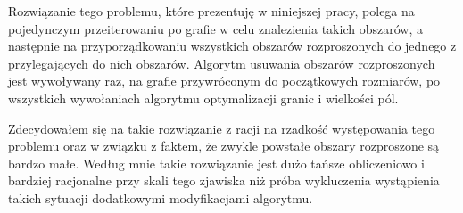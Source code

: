 Rozwiązanie tego problemu, które prezentuję w niniejszej pracy, polega na pojedynczym przeiterowaniu po grafie
w celu znalezienia takich obszarów, a
następnie na przyporządkowaniu wszystkich obszarów rozproszonych do jednego z przylegających do nich obszarów.
Algorytm usuwania obszarów rozproszonych jest wywoływany raz, na grafie przywróconym do początkowych rozmiarów,
po wszystkich wywołaniach
algorytmu optymalizacji granic i wielkości pól.

Zdecydowałem się na takie rozwiązanie z racji na rzadkość występowania tego problemu oraz w związku z faktem, że zwykle
powstałe obszary rozproszone są bardzo małe.
Według mnie takie rozwiązanie jest dużo tańsze obliczeniowo i bardziej racjonalne przy skali tego
zjawiska niż próba wykluczenia wystąpienia takich sytuacji dodatkowymi modyfikacjami algorytmu.